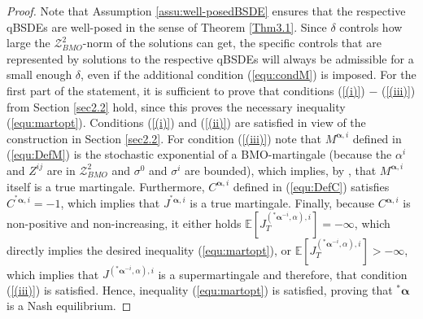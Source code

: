 \documentclass[10pt,a4paper]{article}
\newcommand{\Balpha}{\boldsymbol{\alpha}}
\theoremstyle{plain}
\theoremstyle{definition}
\numberwithin{equation}{section}
\newcommand{\lps}[2]{{}^{#1}\!#2}
\begin{document}
\begin{proof}
Note that Assumption \ref{assu:well-posedBSDE} ensures that the respective qBSDEs are well-posed in the sense of Theorem \ref{Thm3.1}.
Since $\delta$ controls how large the $\mathcal{Z}_{BMO}^{2}$-norm of the solutions can get, the specific controls that are represented by solutions to the respective qBSDEs will always be admissible for a small enough $\delta$, even if the additional condition (\ref{equ:condM}) is imposed. For the first part of the statement, it is sufficient to prove that conditions (\ref{(i)}) $-$ (\ref{(iii)}) from Section \ref{sec2.2} hold, since this proves the necessary inequality (\ref{equ:martopt}). Conditions (\ref{(i)}) and (\ref{(ii)}) are satisfied in view of the construction in Section \ref{sec2.2}.
For condition (\ref{(iii)}) note that $M^{\Balpha,i}$ defined in (\ref{equ:DefM}) is the stochastic exponential of a BMO-martingale (because the $\alpha^{i}$ and $Z^{ij}$ are in $\mathcal{Z}_{BMO}^{2}$ and $\sigma^{0}$ and $\sigma^{i}$ are bounded), which implies, by \cite[Theorem 2.3]{Ref3}, that $M^{\Balpha,i}$ itself is a true martingale. Furthermore, $C^{\Balpha,i}$ defined in (\ref{equ:DefC}) satisfies $C^{\lps{*}\Balpha,i} = -1$, which implies that $J^{\lps{*}\Balpha,i}$ is a true martingale. Finally, because $C^{\Balpha,i}$ is non-positive and non-increasing, it either holds $\mathbb{E}[J_{T}^{(\lps{*}\Balpha^{-i},\alpha),i}] = -\infty$, which directly implies the desired inequality (\ref{equ:martopt}), or $\mathbb{E}[J_{T}^{(\lps{*}\Balpha^{-i},\alpha),i}] > -\infty$, which implies that $J^{(\lps{*}\Balpha^{-i},\alpha),i}$ is a supermartingale and therefore, that condition (\ref{(iii)}) is satisfied. Hence, inequality (\ref{equ:martopt}) is satisfied, proving that $\lps{*}\Balpha$ is a Nash equilibrium. 



\end{proof}
\end{document}
